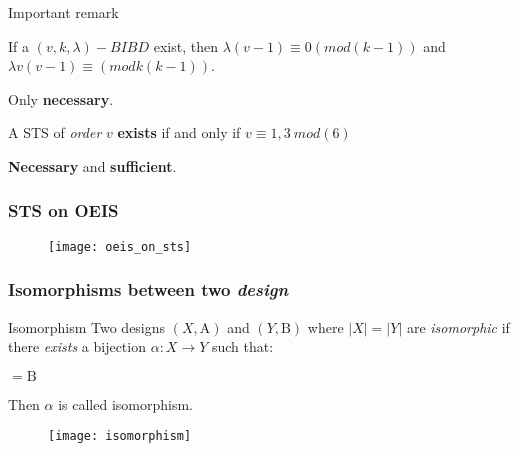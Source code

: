 \begin{frame}[plain,c]
\begin{center}
	\huge Important remark
\end{center}
\end{frame}

\begin{frame}
	\pause[1]
	\begin{theorem}
		If a $(v,k,\lambda)-BIBD$ exist, then $\lambda(v-1) \equiv 0 (mod(k-1))$ and $\lambda v(v-1) \equiv (mod k(k-1))$.
	\end{theorem}
	
	\pause[2]
	Only \textbf{necessary}.
	
	\pause[1]
	\begin{theorem}
		A STS of \textit{order} $v$ \textbf{exists} if and only if $v\equiv 1,3\ mod(6)$  
	\end{theorem}
	
	\pause[2]
	\textbf{Necessary} and \textbf{sufficient}.
\end{frame}
\begin{frame}
\frametitle{STS on OEIS}
\begin{figure}
	\texttt{[image: oeis\_on\_sts]}
\end{figure}
\end{frame}

\begin{frame}
\frametitle{Isomorphisms between two \textit{design}}
\begin{block}{Isomorphism}
Two designs $(X,\mathrm{A})$ and $(Y,\mathrm{B})$ where $|X|=|Y|$ are \textit{isomorphic} if there \textit{exists} a bijection $\alpha : X \rightarrow Y$ such that:
\begin{center}
	\begin{math}
	[ \{ \alpha(x) : x \in A \}: A \mathrm{A} ] = \mathrm{B}
	\end{math}%

\end{center}	
Then $\alpha$ is called isomorphism.
\end{block}
\begin{figure}
	\texttt{[image: isomorphism]}
\end{figure}
\end{frame}

